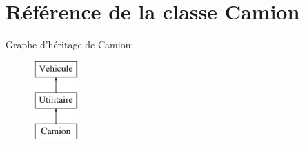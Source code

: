 \hypertarget{class_camion}{
\section{Référence de la classe Camion}
\label{class_camion}
}
Graphe d'héritage de Camion:\begin{figure}[H]
\begin{center}
\leavevmode
\includegraphics[height=3.000000cm]{class_camion}
\end{center}
\end{figure}
